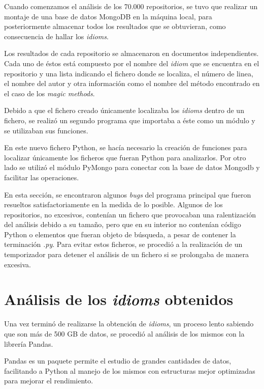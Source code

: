 \documentclass[a4paper, 12pt]{book}
\begin{document}
Cuando comenzamos el análisis de los 70.000 repositorios, se tuvo que realizar un montaje de una base de datos MongoDB en la máquina local, para posteriormente almacenar todos los resultados que se obtuvieran, como consecuencia de hallar los \textit{idioms}.

Los resultados de cada repositorio se almacenaron en documentos independientes. Cada uno de éstos está compuesto por el nombre del \textit{idiom} que se encuentra en el repositorio y una lista indicando el fichero donde se localiza, el número de linea, el nombre del autor y otra información como el nombre del método encontrado en el caso de los \textit{magic methods}.

Debido a que el fichero creado únicamente localizaba los \textit{idioms} dentro de un fichero, se realizó un segundo programa que importaba a éste como un módulo y se utilizaban sus funciones.

En este nuevo fichero Python, se hacía necesario la creación de funciones para localizar únicamente los ficheros que fueran Python para analizarlos. Por otro lado se utilizó el módulo PyMongo para conectar con la base de datos Mongodb y facilitar las operaciones.

En esta sección, se encontraron algunos \textit{bugs} del programa principal que fueron resueltos satisfactoriamente en la medida de lo posible. Algunos de los repositorios, no excesivos, contenían un fichero que provocaban una ralentización del análisis debido a su tamaño, pero que en su interior no contenían código Python o elementos que fueran objeto de búsqueda, a pesar de contener la terminación \textit{.py}. Para evitar estos ficheros, se procedió a la realización de un temporizador para detener el análisis de un fichero si se prolongaba de manera excesiva.



\section{Análisis de los \textit{idioms} obtenidos}
\label{sec:analyze_idioms}

Una vez terminó de realizarse la obtención de \textit{idioms}, un proceso lento sabiendo que son más de 500 GB de datos, se procedió al análisis de los mismos con la librería Pandas.

Pandas es un paquete permite el estudio de grandes cantidades de datos, facilitando a Python al manejo de los mismos con estructuras mejor optimizadas para mejorar el rendimiento.
\end{document}
